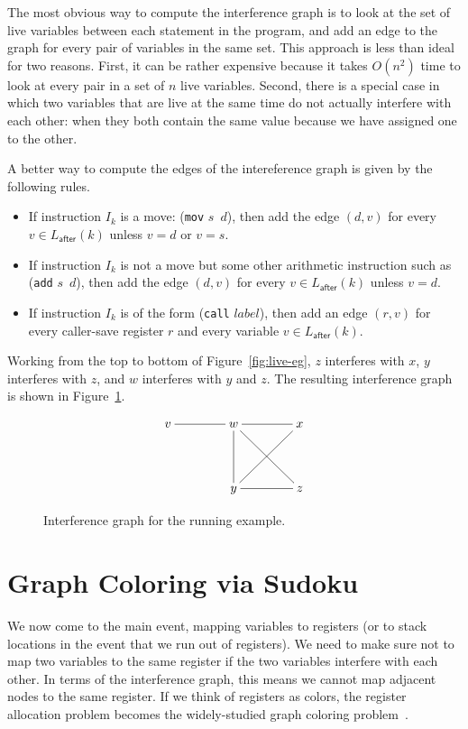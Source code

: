 \documentclass[12pt]{book}
\newcommand{\key}[1]{\texttt{#1}}
\begin{document}
The most obvious way to compute the interference graph is to look at
the set of live variables between each statement in the program, and
add an edge to the graph for every pair of variables in the same set.
This approach is less than ideal for two reasons. First, it can be
rather expensive because it takes $O(n^2)$ time to look at every pair
in a set of $n$ live variables. Second, there is a special case in
which two variables that are live at the same time do not actually
interfere with each other: when they both contain the same value
because we have assigned one to the other.

A better way to compute the edges of the intereference graph is given
by the following rules.

\begin{itemize}
\item If instruction $I_k$ is a move: (\key{mov} $s$\, $d$), then add
  the edge $(d,v)$ for every $v \in L_{\mathsf{after}}(k)$ unless $v =
  d$ or $v = s$.

\item If instruction $I_k$ is not a move but some other arithmetic
  instruction such as (\key{add} $s$\, $d$), then add the edge $(d,v)$
  for every $v \in L_{\mathsf{after}}(k)$ unless $v = d$.
  
\item If instruction $I_k$ is of the form (\key{call}
  $\mathit{label}$), then add an edge $(r,v)$ for every caller-save
  register $r$ and every variable $v \in L_{\mathsf{after}}(k)$.
\end{itemize}

Working from the top to bottom of Figure~\ref{fig:live-eg}, $z$
interferes with $x$, $y$ interferes with $z$, and $w$ interferes with
$y$ and $z$.  The resulting interference graph is shown in
Figure~\ref{fig:interfere}.

\begin{figure}[tbp]
\large
\[
\xymatrix@=40pt{
  v \ar@{-}[r] & w \ar@{-}[r]\ar@{-}[d]\ar@{-}[dr] &  x \ar@{-}[dl]\\
               & y \ar@{-}[r] & z
}
\]
\caption{Interference graph for the running example.}
\label{fig:interfere}
\end{figure}


\section{Graph Coloring via Sudoku}

We now come to the main event, mapping variables to registers (or to
stack locations in the event that we run out of registers).  We need
to make sure not to map two variables to the same register if the two
variables interfere with each other.  In terms of the interference
graph, this means we cannot map adjacent nodes to the same register.
If we think of registers as colors, the register allocation problem
becomes the widely-studied graph coloring
problem~\citep{Balakrishnan:1996ve,Rosen:2002bh}.  
\end{document}
